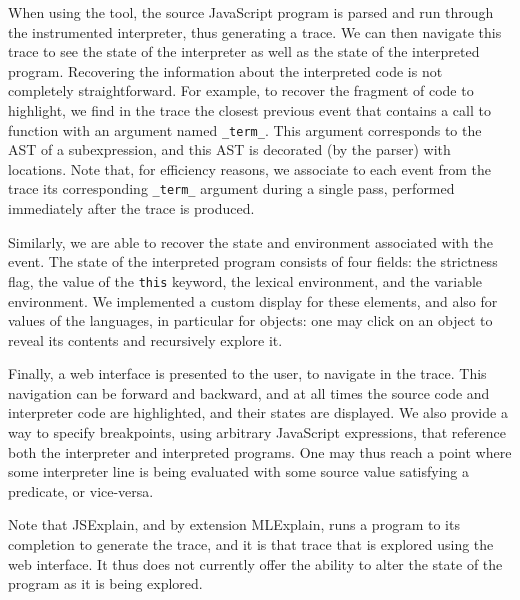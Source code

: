 \documentclass[twocolumn,a4paper]{article}
\begin{document}
When using the tool, the source JavaScript program is parsed and run through the
instrumented interpreter, thus generating a trace. We can then navigate this
trace to see the state of the interpreter as well as the state of the
interpreted program. Recovering the information about the interpreted code is
not completely straightforward. For example, to recover the fragment of code to
highlight, we find in the trace the closest previous event that contains a call
to function with an argument named \texttt{\_term\_}. This argument corresponds
to the AST of a subexpression, and this AST is decorated (by the parser) with
locations. Note that, for efficiency reasons, we associate to each event from
the trace its corresponding \texttt{\_term\_} argument during a single pass,
performed immediately after the trace is produced.

Similarly, we are able to recover the state and environment associated with the
event. The state of the interpreted program consists of four fields: the
strictness flag, the value of the \texttt{this} keyword, the lexical
environment, and the variable environment. We implemented a custom display for
these elements, and also for values of the languages, in particular for objects:
one may click on an object to reveal its contents and recursively explore it.

Finally, a web interface is presented to the user, to navigate in the trace.
This navigation can be forward and backward, and at all times the source code
and interpreter code are highlighted, and their states are displayed. We also
provide a way to specify breakpoints, using arbitrary JavaScript expressions,
that reference both the interpreter and interpreted programs. One may thus reach
a point where some interpreter line is being evaluated with some source value
satisfying a predicate, or vice-versa.

Note that JSExplain, and by extension MLExplain, runs a program to its
completion to generate the trace, and it is that trace that is explored using
the web interface. It thus does not currently offer the ability to alter the
state of the program as it is being explored.
\end{document}
